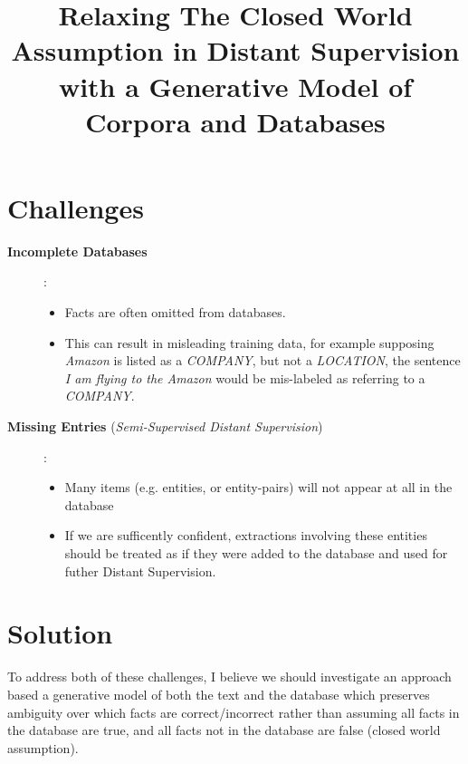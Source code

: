 \documentclass[12pt]{article}
\begin{document}
\date{}
\title{Relaxing The Closed World Assumption in Distant Supervision with a Generative Model of Corpora and Databases}
\author{}
\maketitle



\section{Challenges}
\begin{description}
  \item[{\bf Incomplete Databases}]:
    \begin{itemize}
    \item Facts are often omitted from databases.
    \item This can result in misleading training data, for example supposing \emph{Amazon} is listed as a {\sl COMPANY},
      but not a {\sl LOCATION}, the sentence \emph{I am flying to the Amazon} would be mis-labeled as referring
      to a {\sl COMPANY}.
    \end{itemize}
  \item[{\bf Missing Entries} (\emph{Semi-Supervised Distant Supervision})]:
    \begin{itemize}
      \item Many items (e.g. entities, or entity-pairs) will not appear at all in the database
      \item If we are sufficently confident, extractions involving these entities should be treated as if they were added to the database
        and used for futher Distant Supervision.
    \end{itemize}
\end{description}

\section{Solution}
To address both of these challenges, I believe we should investigate an approach based a generative model of both the text and the database which
preserves ambiguity over which facts are correct/incorrect rather than assuming all facts in the database are true, and all facts not in the database
are false (closed world assumption).
\end{document}
